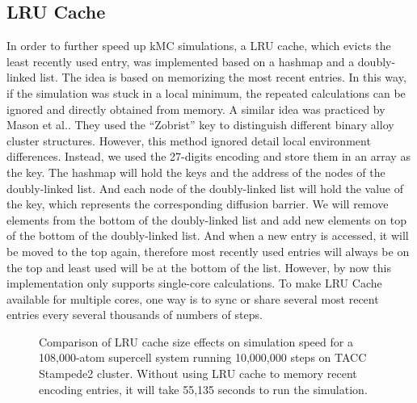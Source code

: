 \subsection{\acf{LRU} Cache}
In order to further speed up \ac{kMC} simulations, a \acf{LRU} cache, which evicts the least recently used entry, was implemented based on a hashmap and a  doubly-linked list. The idea is based on memorizing the most recent entries. In this way, if the simulation was stuck in a local minimum, the repeated calculations can be ignored and directly obtained from memory. A similar idea was practiced by Mason et al.\cite{mason2005fast}. They used the ``Zobrist'' key to distinguish different binary alloy cluster structures. However, this method ignored detail local environment differences. Instead, we used the 27-digits encoding and store them in an array as the key. The hashmap will hold the keys and the address of the nodes of the doubly-linked list. And each node of the doubly-linked list will hold the value of the key, which represents the corresponding diffusion barrier. We will remove elements from the bottom of the doubly-linked list and add new elements on top of the bottom of the doubly-linked list. And when a new entry is accessed, it will be moved to the top again, therefore most recently used entries will always be on the top and least used will be at the bottom of the list. However, by now this implementation only supports single-core calculations. To make \ac{LRU} Cache available for multiple cores, one way is to sync or share several most recent entries every several thousands of numbers of steps.


\begingroup
\begin{figure}[!ht]
  \centering
\caption[Comparison of \acs{LRU} cache size effects on simulation speed for a 108,000-atom supercell system running 10,000,000 steps on TACC Stampede2 cluster.]{Comparison of \acs{LRU} cache size effects on simulation speed for a 108,000-atom supercell system running 10,000,000 steps on TACC Stampede2 cluster. Without using \ac{LRU} cache to memory recent encoding entries, it will take 55,135 seconds to run the simulation.}
\label{Chap:Al/Vac:fig:lru_size}
\end{figure}
\endgroup


